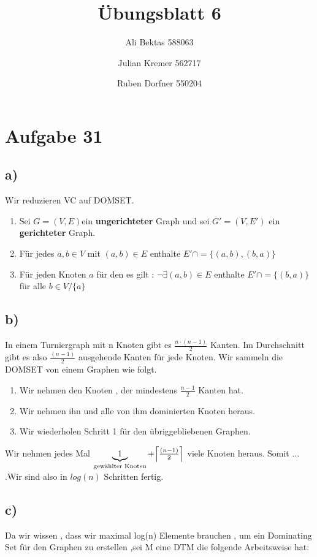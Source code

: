 \documentclass{article}
\title{Übungsblatt 6}
\author{Ali Bektas 588063 \and Julian Kremer 562717 \and Ruben Dorfner 550204}
\def\mathify#1{\ifmmode{#1}\else\mbox{$#1$}\fi} %
\newcommand{\ceil}[1]{\mathify{\left\lceil {#1}\right\rceil}}
\begin{document}
	\maketitle
	
	\section*{Aufgabe 31}
		\subsection*{a)}
			Wir reduzieren VC auf DOMSET.
			\begin{enumerate}
				\item Sei $G=(V,E)$ein \textbf{ungerichteter} Graph und sei $G'=(V,E')$ ein \textbf{gerichteter} Graph.
				\item Für jedes $a,b \in V$ mit $(a,b)\in E$ enthalte $E' \cap = \{(a,b),(b,a)\}$
				\item Für jeden Knoten $a$ für den es gilt : $\neg\exists (a,b)\in E$ enthalte $E' \cap = \{(b,a)\}$ für alle $b \in V/\{a\}$
			\end{enumerate}

		\subsection*{b)}
			In einem Turniergraph mit n Knoten gibt es $ \frac{n\cdot(n-1)}{2}$ Kanten. Im Durchschnitt gibt es also $ \frac{(n-1)}{2}$ ausgehende Kanten für jede Knoten. Wir sammeln die DOMSET von einem Graphen wie folgt. 

			\begin{enumerate}
				\item Wir nehmen den Knoten , der mindestens $\frac{n-1}{2}$ Kanten hat.
				\item Wir nehmen ihn und alle von ihm dominierten Knoten heraus.
				\item Wir wiederholen Schritt 1 für den übriggebliebenen Graphen. 
			\end{enumerate}

			Wir nehmen jedes Mal $\underbrace{1}_{\text{gewählter Knoten}} +\ceil{\frac{(n-1)}{2}}$ viele Knoten heraus. Somit $\dots$ .Wir sind also in $log(n)$ Schritten fertig. 
		\subsection*{c)}
			Da wir wissen , dass wir maximal log(n) Elemente brauchen , um ein Dominating Set für den Graphen zu erstellen ,sei M eine DTM die folgende Arbeitsweise hat:
\end{document}
